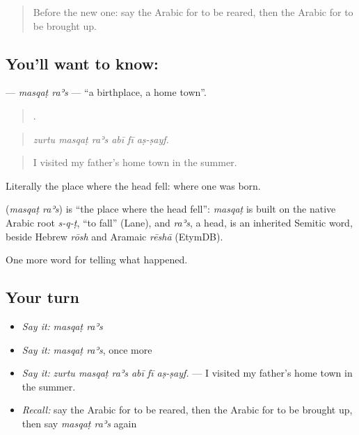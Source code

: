 \label{lesson:AR-C323-masqat-ras}



\begin{quote}
Before the new one: say the Arabic for to be reared, then the Arabic for to be brought up.
\end{quote}

\subsection*{You'll want to know:  }
\textbf{ } — \emph{masqaṭ raʾs} — \textquotedblleft{}a birthplace, a home town\textquotedblright{}.

\begin{quote}
     .
\end{quote}

\begin{quote}
\emph{zurtu masqaṭ raʾs abī fī aṣ-ṣayf.}
\end{quote}

\begin{quote}
I visited my father’s home town in the summer.
\end{quote}

Literally the place where the head fell: where one was born.

\begin{cousinweb}
\textbf{ } (\emph{masqaṭ raʾs}) is \textquotedblleft{}the place where the head fell\textquotedblright{}: \emph{masqaṭ} is built on the native Arabic root \emph{s-q-ṭ}, \textquotedblleft{}to fall\textquotedblright{} (Lane), and \emph{raʾs}, a head, is an inherited Semitic word, beside Hebrew \emph{rōsh} and Aramaic \emph{rēshā} (EtymDB).
\end{cousinweb}

\begin{grammarlens}[title={What you've built}]
One more word for telling what happened.
\end{grammarlens}

\subsection*{Your turn}
\begin{itemize}
\raggedright
  \item \emph{Say it:} \emph{masqaṭ raʾs}
  \item \emph{Say it:} \emph{masqaṭ raʾs}, once more
  \item \emph{Say it:} \emph{zurtu masqaṭ raʾs abī fī aṣ-ṣayf.} — I visited my father’s home town in the summer.
  \item \emph{Recall:} say the Arabic for to be reared, then the Arabic for to be brought up, then say \emph{masqaṭ raʾs} again
\end{itemize}

